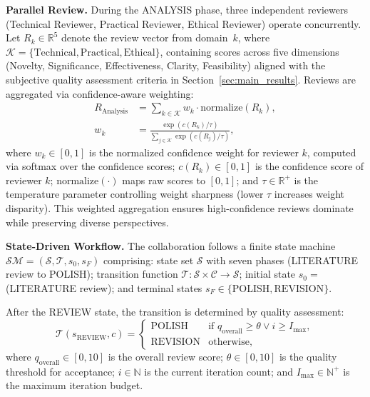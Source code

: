 \documentclass[runningheads]{llncs}
\begin{document}
\textbf{Parallel Review.} During the ANALYSIS phase, three independent reviewers (Technical Reviewer, Practical Reviewer, Ethical Reviewer) operate concurrently. Let $R_k \in \mathbb{R}^5$ denote the review vector from domain~$k$, where $\mathcal{K} = \{\text{Technical}, \text{Practical}, \text{Ethical}\}$, containing scores across five dimensions (Novelty, Significance, Effectiveness, Clarity, Feasibility) aligned with the subjective quality assessment criteria in Section~\ref{sec:main_results}. Reviews are aggregated via confidence-aware weighting:
\begin{align}
    R_{\text{Analysis}} &= \sum_{k \in \mathcal{K}} w_k \cdot \text{normalize}(R_k), \\
    w_k &= \frac{\exp(c(R_k) / \tau)}{\sum_{j \in \mathcal{K}} \exp(c(R_j) / \tau)},
\end{align}
where $w_k \in [0, 1]$ is the normalized confidence weight for reviewer $k$, computed via softmax over the confidence scores; $c(R_k) \in [0, 1]$ is the confidence score of reviewer $k$; $\text{normalize}(\cdot)$ maps raw scores to $[0, 1]$; and $\tau \in \mathbb{R}^+$ is the temperature parameter controlling weight sharpness (lower $\tau$ increases weight disparity). This weighted aggregation ensures high-confidence reviews dominate while preserving diverse perspectives.

\textbf{State-Driven Workflow.} The collaboration follows a finite state machine $\mathcal{SM} = (\mathcal{S}, \mathcal{T}, s_0, s_F)$ comprising: state set $\mathcal{S}$ with seven phases (LITERATURE review to POLISH); transition function $\mathcal{T}: \mathcal{S} \times \mathcal{C} \rightarrow \mathcal{S}$; initial state $s_0 = $ (LITERATURE review); and terminal states $s_F \in \{\text{POLISH}, \text{REVISION}\}$.

After the REVIEW state, the transition is determined by quality assessment:
\begin{equation}
    \mathcal{T}(s_{\text{REVIEW}}, c) =
    \begin{cases}
        \text{POLISH} & \text{if } q_{\text{overall}} \geq \theta \lor i \geq I_{\max}, \\
        \text{REVISION} & \text{otherwise},
    \end{cases}
\end{equation}
where $q_{\text{overall}} \in [0, 10]$ is the overall review score; $\theta \in [0, 10]$ is the quality threshold for acceptance; $i \in \mathbb{N}$ is the current iteration count; and $I_{\max} \in \mathbb{N}^+$ is the maximum iteration budget.
\end{document}
